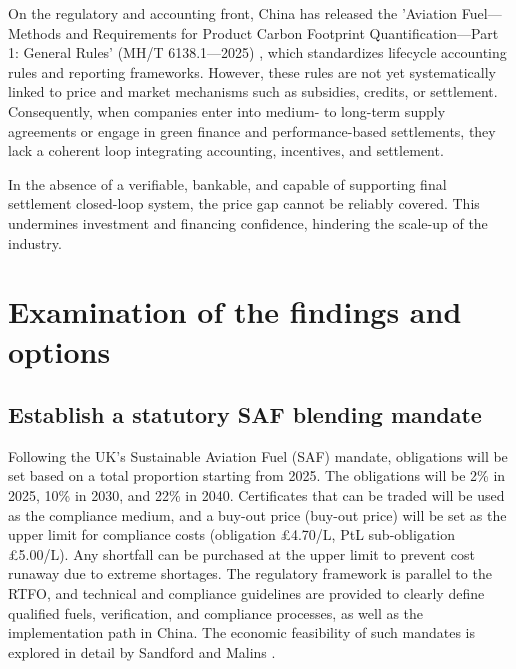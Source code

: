 \documentclass[a4paper,11pt]{article}
\begin{document}
On the regulatory and accounting front, China has released the 'Aviation Fuel---Methods and Requirements for Product Carbon Footprint Quantification---Part 1: General Rules' (MH/T 6138.1---2025) \cite{caac2025}, which standardizes lifecycle accounting rules and reporting frameworks. However, these rules are not yet systematically linked to price and market mechanisms such as subsidies, credits, or settlement. Consequently, when companies enter into medium- to long-term supply agreements or engage in green finance and performance-based settlements, they lack a coherent loop integrating accounting, incentives, and settlement.

In the absence of a verifiable, bankable, and capable of supporting final settlement closed-loop system, the price gap cannot be reliably covered. This undermines investment and financing confidence, hindering the scale-up of the industry.


\section{Examination of the findings and options}

\subsection{Establish a statutory SAF blending mandate}
Following the UK's Sustainable Aviation Fuel (SAF) mandate, obligations will be set based on a total proportion starting from 2025. The obligations will be 2\% in 2025, 10\% in 2030, and 22\% in 2040. Certificates that can be traded will be used as the compliance medium, and a buy-out price (buy-out price) will be set as the upper limit for compliance costs (obligation £4.70/L, PtL sub-obligation £5.00/L). Any shortfall can be purchased at the upper limit to prevent cost runaway due to extreme shortages. The regulatory framework is parallel to the RTFO, and technical and compliance guidelines are provided to clearly define qualified fuels, verification, and compliance processes, as well as the implementation path in China. The economic feasibility of such mandates is explored in detail by Sandford and Malins \cite{sandford2024}.
\end{document}
